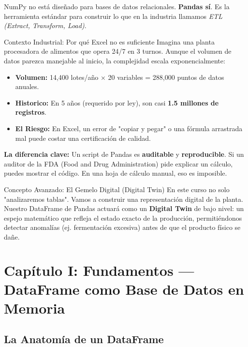 \documentclass[11pt, a4paper]{article}
\begin{document}
NumPy no está diseñado para bases de datos relacionales. \textbf{Pandas sí}. Es la herramienta estándar para construir lo que en la industria llamamos \textit{ETL (Extract, Transform, Load)}.

\begin{industrybox}{Contexto Industrial: Por qué Excel no es suficiente}
Imagina una planta procesadora de alimentos que opera 24/7 en 3 turnos. Aunque el volumen de datos parezca manejable al inicio, la complejidad escala exponencialmente:

\begin{itemize}
    \item \textbf{Volumen:} 14,400 lotes/año × 20 variables = 288,000 puntos de datos anuales.
    \item \textbf{Historico:} En 5 años (requerido por ley), son casi \textbf{1.5 millones de registros}.
    \item \textbf{El Riesgo:} En Excel, un error de "copiar y pegar" o una fórmula arrastrada mal puede costar una certificación de calidad.
\end{itemize}

\textbf{La diferencia clave:} Un script de Pandas es \textbf{auditable} y \textbf{reproducible}. Si un auditor de la FDA (Food and Drug Administration) pide explicar un cálculo, puedes mostrar el código. En una hoja de cálculo manual, eso es imposible.
\end{industrybox}

\begin{sciencebox}{Concepto Avanzado: El Gemelo Digital (Digital Twin)}
En este curso no solo "analizaremos tablas". Vamos a construir una representación digital de la planta.
Nuestro DataFrame de Pandas actuará como un \textbf{Digital Twin} de bajo nivel: un espejo matemático que refleja el estado exacto de la producción, permitiéndonos detectar anomalías (ej. fermentación excesiva) antes de que el producto físico se dañe.
\end{sciencebox}

\newpage

\section{Capítulo I: Fundamentos — DataFrame como Base de Datos en Memoria}

\subsection{La Anatomía de un DataFrame}
\end{document}
